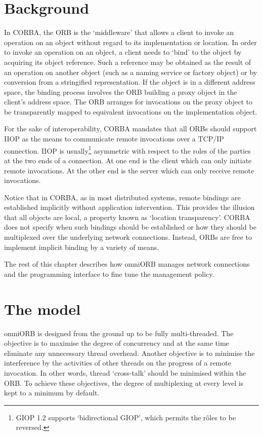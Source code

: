 \documentclass[11pt,oneside,a4paper]{book}
\begin{document}
\section{Background}

In CORBA, the ORB is the `middleware' that allows a client to invoke
an operation on an object without regard to its implementation or
location. In order to invoke an operation on an object, a client needs
to `bind' to the object by acquiring its object reference. Such a
reference may be obtained as the result of an operation on another
object (such as a naming service or factory object) or by conversion
from a stringified representation. If the object is in a different
address space, the binding process involves the ORB building a proxy
object in the client's address space. The ORB arranges for invocations
on the proxy object to be transparently mapped to equivalent
invocations on the implementation object.

For the sake of interoperability, CORBA mandates that all ORBs should
support IIOP as the means to communicate remote invocations over a
TCP/IP connection. IIOP is usually\footnote{GIOP 1.2 supports
`bidirectional GIOP', which permits the r\^oles to be reversed.}
asymmetric with respect to the roles of the parties at the two ends of
a connection. At one end is the client which can only initiate remote
invocations. At the other end is the server which can only receive
remote invocations.

Notice that in CORBA, as in most distributed systems, remote bindings
are established implicitly without application intervention. This
provides the illusion that all objects are local, a property known as
`location transparency'. CORBA does not specify when such bindings
should be established or how they should be multiplexed over the
underlying network connections. Instead, ORBs are free to implement
implicit binding by a variety of means.

The rest of this chapter describes how omniORB manages network
connections and the programming interface to fine tune the management
policy.


\section{The model}

omniORB is designed from the ground up to be fully multi-threaded. The
objective is to maximise the degree of concurrency and at the same
time eliminate any unnecessary thread overhead. Another objective is
to minimise the interference by the activities of other threads on the
progress of a remote invocation. In other words, thread `cross-talk'
should be minimised within the ORB. To achieve these objectives, the
degree of multiplexing at every level is kept to a minimum by default.
\end{document}
